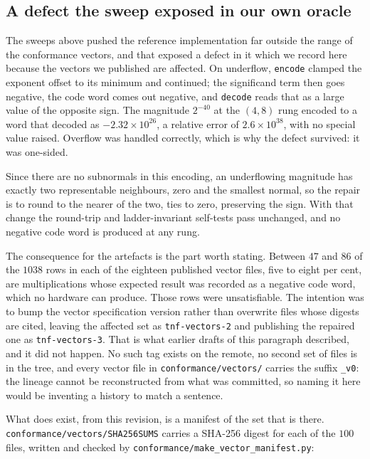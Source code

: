 \documentclass[11pt]{article}
\theoremstyle{definition}
\begin{document}
\subsection{A defect the sweep exposed in our own oracle}
\label{sec:oracledefect}

The sweeps above pushed the reference implementation far outside the range of the
conformance vectors, and that exposed a defect in it which we record here because
the vectors we published are affected. On underflow, \texttt{encode} clamped the
exponent offset to its minimum and continued; the significand term then goes
negative, the code word comes out negative, and \texttt{decode} reads that as a
large value of the opposite sign. The magnitude $2^{-40}$ at the $(4,8)$ rung
encoded to a word that decoded as $-2.32\times 10^{26}$, a relative error of
$2.6\times 10^{38}$, with no special value raised. Overflow was handled correctly,
which is why the defect survived: it was one-sided.

Since there are no subnormals in this encoding, an underflowing magnitude has
exactly two representable neighbours, zero and the smallest normal, so the repair
is to round to the nearer of the two, ties to zero, preserving the sign. With that
change the round-trip and ladder-invariant self-tests pass unchanged, and no
negative code word is produced at any rung.

The consequence for the artefacts is the part worth stating. Between $47$ and
$86$ of the $1038$ rows in each of the eighteen published vector files, five to
eight per cent, are multiplications whose expected result was recorded as a
negative code word, which no hardware can produce. Those rows were unsatisfiable.
The intention was to bump the vector specification version rather than overwrite
files whose digests are cited, leaving the affected set as \texttt{tnf-vectors-2}
and publishing the repaired one as \texttt{tnf-vectors-3}. That is what earlier
drafts of this paragraph described, and it did not happen. No such tag exists on
the remote, no second set of files is in the tree, and every vector file in
\texttt{conformance/vectors/} carries the suffix \texttt{\_v0}: the lineage
cannot be reconstructed from what was committed, so naming it here would be
inventing a history to match a sentence.

What does exist, from this revision, is a manifest of the set that is there.
\texttt{conformance/vectors/SHA256SUMS} carries a SHA-256 digest for each of the
$100$ files, written and checked by
\texttt{conformance/}\allowbreak\texttt{make\_vector\_manifest.py}:
\end{document}
